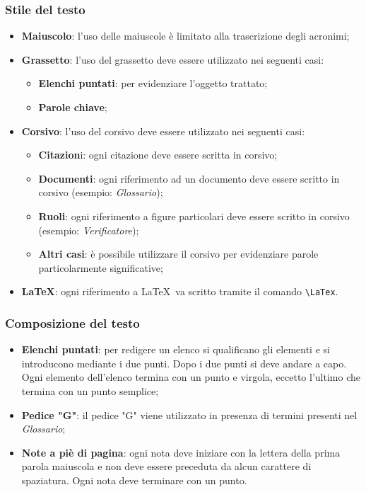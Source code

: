 \subsubsection{Stile del testo}
\begin{itemize}
	\item \textbf{Maiuscolo}: l'uso delle maiuscole è limitato alla trascrizione degli acronimi;
	\item \textbf{Grassetto}: l'uso del grassetto deve essere utilizzato nei seguenti casi: 
	\begin{itemize}
		\item \textbf{Elenchi puntati}: per evidenziare l'oggetto trattato;
		\item \textbf{Parole chiave};
	\end{itemize}
	\item \textbf{Corsivo}: l'uso del corsivo deve essere utilizzato nei seguenti casi:
	\begin{itemize}
		\item \textbf{Citazion}i: ogni citazione deve essere scritta in corsivo; 
		\item \textbf{Documenti}: ogni riferimento ad un documento deve essere scritto in corsivo (esempio: \textit{Glossario});
		\item \textbf{Ruoli}: ogni riferimento a figure particolari deve essere scritto in corsivo (esempio: \textit{Verificatore});
		\item \textbf{Altri casi}: è possibile utilizzare il corsivo per evidenziare parole particolarmente significative;
	\end{itemize}
	\item \textbf{\LaTeX}: ogni riferimento a \LaTeX\ va scritto tramite il comando \verb|\LaTex|.
\end{itemize}

\subsubsection{Composizione del testo}
\begin{itemize}
	\item \textbf{Elenchi puntati}: per redigere un elenco si qualificano gli elementi e si introducono mediante
	i due punti. Dopo i due punti si deve andare a capo. Ogni elemento dell'elenco termina con un punto e virgola, eccetto l'ultimo che termina con un punto semplice;
	\item \textbf{Pedice "G"}: il pedice "G" viene utilizzato in presenza di termini presenti nel \textit{Glossario};
	\item \textbf{Note a piè di pagina}: ogni nota deve iniziare con la lettera della prima parola maiuscola e non deve essere preceduta da alcun carattere di spaziatura. Ogni nota deve terminare con un punto.
\end{itemize}


